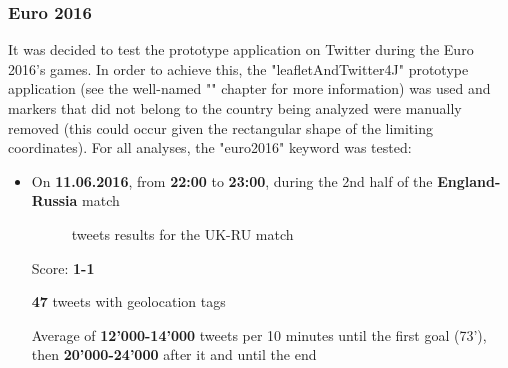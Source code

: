 \documentclass[a4paper,11pt]{report}
\begin{document}
\vspace{-20pt}

\subsubsection{Euro 2016}
It was decided to test the prototype application on Twitter during the Euro 2016's games. In order to achieve this, the "leafletAndTwitter4J" prototype application (see the well-named "" chapter for more information) was used and markers that did not belong to the country being analyzed were manually removed (this could occur given the rectangular shape of the limiting coordinates). For all analyses, the "euro2016" keyword was tested:
\begin{itemize}
	\item On \textbf{11.06.2016}, from \textbf{22:00} to \textbf{23:00}, during the 2nd half of the \textbf{England-Russia} match
	\vspace{50pt}
	\parbox[t]{\dimexpr\textwidth-\leftmargin}{%
		\begin{figure}
		\vspace{-50pt}
		\begin{center}
		\vspace{-8pt}
		\caption{tweets results for the UK-RU match}
		\end{center}
		\end{figure}
		\vspace{-15pt}
		
		\vspace{40pt}
		Score: \textbf{1-1}
		
		\vspace{5pt}
		\textbf{47} tweets with geolocation tags
		
		\vspace{5pt}
		Average of \textbf{12'000-14'000} tweets per 10 minutes until the first goal (73'), then \textbf{20'000-24'000} after it and until the end
		
}
\end{itemize}
\end{document}
